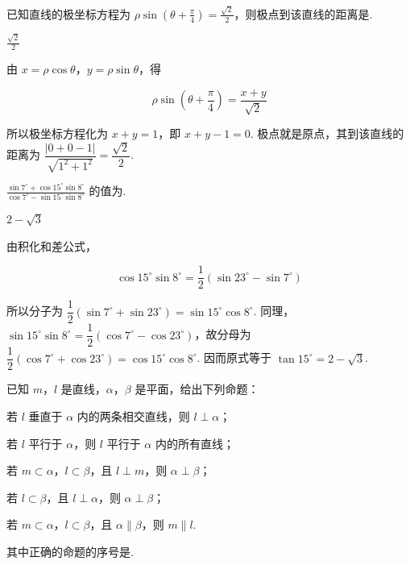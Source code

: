 \documentclass[UTF8,a4paper,oneside,11pt]{ctexbook}
\begin{document}
\begin{problem}
已知直线的极坐标方程为 \(\rho \sin \left(\theta + \frac{\pi}{4}\right) = \frac{\sqrt{2}}{2}\)，则极点到该直线的距离是\fillinblank{}.
\end{problem}

\begin{answer}
\(\frac{\sqrt{2}}{2}\)
\end{answer}

\begin{solution}
由 \(x=\rho\cos\theta\)，\(y=\rho\sin\theta\)，得

\[
\rho\sin\left(\theta+\frac{\pi}{4}\right)=\frac{x+y}{\sqrt{2}}
\]

所以极坐标方程化为 \(x+y=1\)，即 \(x+y-1=0\). 极点就是原点，其到该直线的距离为 \(\dfrac{|0+0-1|}{\sqrt{1^{2}+1^{2}}}=\dfrac{\sqrt{2}}{2}\).
\end{solution}

\begin{problem}
\(\frac{\sin 7^{\circ} + \cos 15^{\circ} \sin 8^{\circ}}{\cos 7^{\circ} - \sin 15^{\circ} \sin 8^{\circ}}\) 的值为\fillinblank{}.
\end{problem}

\begin{answer}
\(2 - \sqrt{3}\)
\end{answer}

\begin{solution}
由积化和差公式，

\[
\cos15^{\circ}\sin8^{\circ}=\frac12\left(\sin23^{\circ}-\sin7^{\circ}\right)
\]

所以分子为 \(\dfrac12(\sin7^{\circ}+\sin23^{\circ})=\sin15^{\circ}\cos8^{\circ}\). 同理，\(\sin15^{\circ}\sin8^{\circ}=\dfrac12(\cos7^{\circ}-\cos23^{\circ})\)，故分母为 \(\dfrac12(\cos7^{\circ}+\cos23^{\circ})=\cos15^{\circ}\cos8^{\circ}\). 因而原式等于 \(\tan15^{\circ}=2-\sqrt{3}\).
\end{solution}

\begin{problem}
已知 \(m\)，\(l\) 是直线，\(\alpha\)，\(\beta\) 是平面，给出下列命题：

\begin{circlelist}
\item 若 \(l\) 垂直于 \(\alpha\) 内的两条相交直线，则 \(l \perp \alpha\)；
\item 若 \(l\) 平行于 \(\alpha\)，则 \(l\) 平行于 \(\alpha\) 内的所有直线；
\item 若 \(m \subset \alpha\)，\(l \subset \beta\)，且 \(l \perp m\)，则 \(\alpha \perp \beta\)；
\item 若 \(l \subset \beta\)，且 \(l \perp \alpha\)，则 \(\alpha \perp \beta\)；
\item 若 \(m \subset \alpha\)，\(l \subset \beta\)，且 \(\alpha \parallel \beta\)，则 \(m \parallel l\).
\end{circlelist}

其中正确的命题的序号是\fillinblank{}.
\end{problem}
\end{document}
